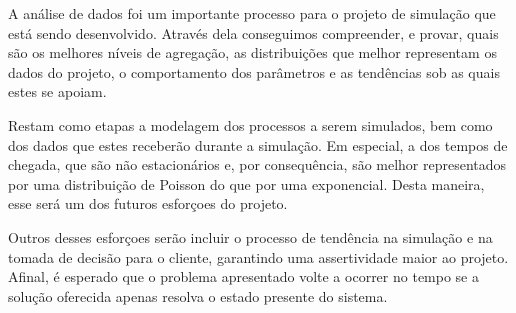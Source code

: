 A análise de dados foi um importante processo para o projeto de simulação que está sendo desenvolvido. Através dela conseguimos compreender, e provar, quais são os melhores níveis de agregação, as distribuições que melhor representam os dados do projeto, o comportamento dos parâmetros e as tendências sob as quais estes se apoiam.

Restam como etapas a modelagem dos processos a serem simulados, bem como dos dados que estes receberão durante a simulação. Em especial, a dos tempos de chegada, que são não estacionários e, por consequência, são melhor representados por uma distribuição de Poisson do que por uma exponencial. Desta maneira, esse será um dos futuros esforçoes do projeto.

Outros desses esforçoes serão incluir o processo de tendência na simulação e na tomada de decisão para o cliente, garantindo uma assertividade maior ao projeto. Afinal, é esperado que o problema apresentado volte a ocorrer no tempo se a solução oferecida apenas resolva o estado presente do sistema.